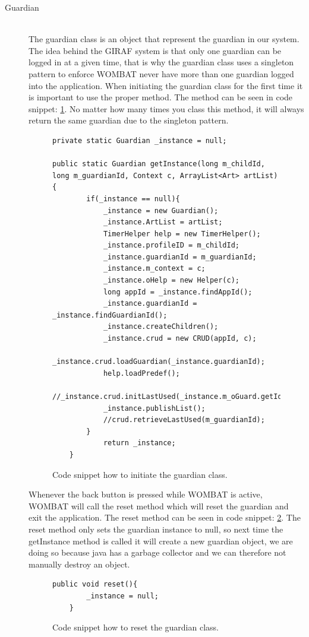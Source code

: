 \begin{description}
  \item[Guardian] \hfill \\
  The guardian class is an object that represent the guardian in our system. The idea behind the GIRAF system is that only one guardian can be logged in at a given time, that is why the guardian class uses a singleton pattern to enforce WOMBAT never have more than one guardian logged into the application. When initiating the guardian class for the first time it is important to use the proper method. The method can be seen in code snippet: \ref{code:guardianinit}. No matter how many times you class this method, it will always return the same guardian due to the singleton pattern.
	
	\begin{figure}[H]
\begin{lstlisting}
private static Guardian _instance = null;

public static Guardian getInstance(long m_childId, long m_guardianId, Context c, ArrayList<Art> artList){
		if(_instance == null){
			_instance = new Guardian();
			_instance.ArtList = artList;
			TimerHelper help = new TimerHelper();
			_instance.profileID = m_childId;
			_instance.guardianId = m_guardianId;
			_instance.m_context = c;
			_instance.oHelp = new Helper(c);
			long appId = _instance.findAppId();
			_instance.guardianId = _instance.findGuardianId();
			_instance.createChildren();
			_instance.crud = new CRUD(appId, c);
			_instance.crud.loadGuardian(_instance.guardianId);
			help.loadPredef();
			//_instance.crud.initLastUsed(_instance.m_oGuard.getId());
			_instance.publishList();			
			//crud.retrieveLastUsed(m_guardianId);
		}
			return _instance;
	}
\end{lstlisting}
\caption{Code snippet how to initiate the guardian class.}%
\label{code:guardianinit}%
\end{figure}

Whenever the back button is pressed while WOMBAT is active, WOMBAT will call the reset method which will reset the guardian and exit the application. The reset method can be seen in code snippet: \ref{code:guardianreset}. The reset method only sets the guardian instance to null, so next time the getInstance method is called it will create a new guardian object, we are doing so because java has a garbage collector and we can therefore not manually destroy an object.
	
\begin{figure}[H]
\begin{lstlisting}
public void reset(){
		_instance = null;
	}
\end{lstlisting}
\caption{Code snippet how to reset the guardian class.}%
\label{code:guardianreset}%
\end{figure}


\end{description}

